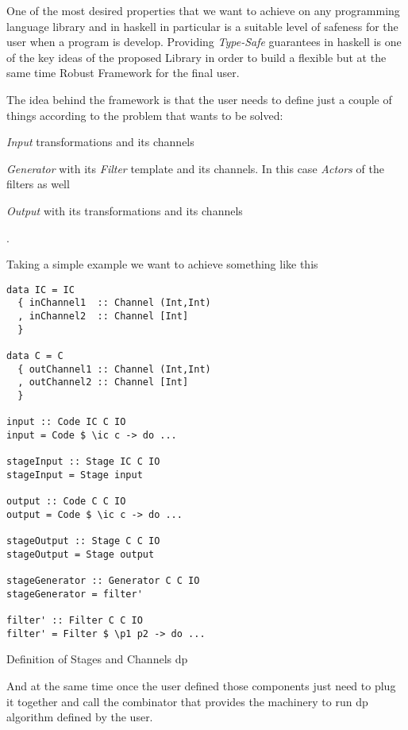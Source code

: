 \documentclass[preprint]{elsarticle}
\begin{document}
One of the most desired properties that we want to achieve on any programming language library and in \acrshort{haskell} in particular is a suitable level of safeness for the user when a program is develop. 
Providing \emph{Type-Safe} guarantees in \acrshort{haskell} is one of the key ideas of the proposed Library in order to build a flexible but at the same time Robust Framework for the final user. 

The idea behind the framework is that the user needs to define just a couple of things according to the problem that wants to be solved: \begin{inparaenum}[i\upshape)]
\item \emph{Input} transformations and its channels
\item \emph{Generator} with its \emph{Filter} template and its channels. In this case \emph{Actors} of the filters as well
\item \emph{Output} with its transformations and its channels
 \end{inparaenum}.
 
Taking a simple example we want to achieve something like this
 
\begin{listing}[H]
\begin{verbatim}      
data IC = IC
  { inChannel1  :: Channel (Int,Int)
  , inChannel2  :: Channel [Int]
  }

data C = C
  { outChannel1 :: Channel (Int,Int)
  , outChannel2 :: Channel [Int]
  }

input :: Code IC C IO
input = Code $ \ic c -> do ...

stageInput :: Stage IC C IO
stageInput = Stage input

output :: Code C C IO
output = Code $ \ic c -> do ...

stageOutput :: Stage C C IO
stageOutput = Stage output

stageGenerator :: Generator C C IO
stageGenerator = filter'

filter' :: Filter C C IO
filter' = Filter $ \p1 p2 -> do ...

\end{verbatim}
\caption{Definition of Stages and Channels \acrshort{dp}}
\label{src:haskell:lib:1}
\end{listing}

And at the same time once the user defined those components just need to plug it together and call the combinator that provides the machinery to run \acrshort{dp} algorithm defined by the user.
\end{document}
